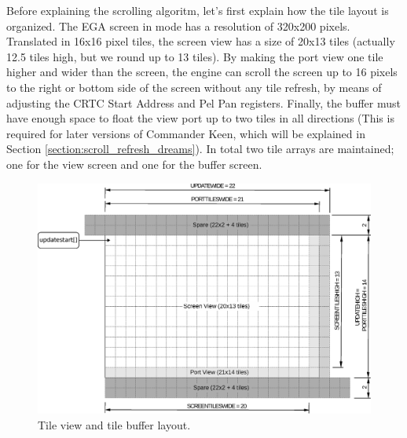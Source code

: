 \documentclass[book.tex]{subfiles}
\begin{document}
\par
Before explaining the scrolling algoritm, let's first explain how the tile layout is organized. The EGA screen in mode  has a resolution of 320x200 pixels. Translated in 16x16 pixel tiles, the screen view has a size of 20x13 tiles (actually 12.5 tiles high, but we round up to 13 tiles). By making the port view one tile higher and wider than the screen, the engine can scroll the screen up to 16 pixels to the right or bottom side of the screen without any tile refresh, by means of adjusting the CRTC Start Address and Pel Pan registers. Finally, the buffer must have enough space to float the view port up to two tiles in all directions (This is required for later versions of Commander Keen, which will be explained in Section \ref{section:scroll_refresh_dreams}). In total two tile arrays are maintained; one for the view screen and one for the buffer screen.\\
\par
 
\begin{figure}[H]
\centering
\includegraphics[width=\textwidth]{imgs/drawings/buffer_tile_layout.eps}
\caption{Tile view and tile buffer layout.}
\label{fig:screen_setup}
\end{figure}
\end{document}
